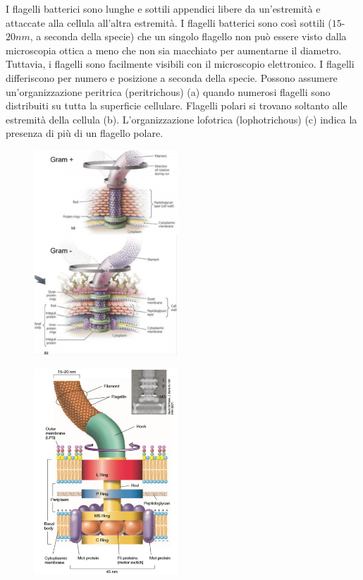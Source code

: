 I flagelli batterici sono lunghe e sottili appendici libere da un'estremità e attaccate alla cellula all'altra estremità. I flagelli batterici sono così 
sottili ($15$-$20 nm$, a seconda della specie) che un singolo flagello non può essere visto dalla microscopia ottica a meno che non sia macchiato per aumentarne 
il diametro. Tuttavia, i flagelli sono facilmente visibili con il microscopio elettronico. I flagelli differiscono per numero e posizione  a seconda della 
specie. Possono assumere un’organizzazione peritrica (peritrichous) (a) quando numerosi flagelli 
sono distribuiti su tutta la superficie cellulare. Flagelli polari si trovano soltanto alle estremità della cellula (b). L’organizzazione lofotrica 
(lophotrichous) (c) indica la presenza di più di un flagello polare. \\
\newpage
\begin{multicols}{2}
\begin{figure}[H]
	\includegraphics[width=0.48\textwidth]{Pictures/15.png}
\end{figure}
	
\begin{figure}[H]
	\includegraphics[width=0.48\textwidth]{Pictures/16.png}
\end{figure}
\end{multicols}

